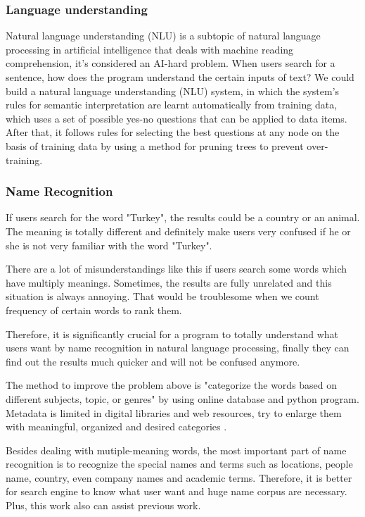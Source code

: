\subsubsection*{Language understanding}

Natural language understanding (NLU) is a subtopic of natural language processing in artificial intelligence that deals with machine reading comprehension, it's considered an AI-hard problem.
When users search for a sentence, how does the program understand the certain inputs of text? We could build a natural language understanding (NLU) system, in which the system's rules for semantic interpretation are learnt automatically from training data, which uses a set of possible yes-no questions that can be applied to data items.
After that, it follows rules for selecting the best questions at any node on the basis of training data by using a method for pruning trees to prevent over-training.

\subsubsection*{Name Recognition}

If users search for the word "Turkey", the results could be a country or an animal. 
The meaning is totally different and definitely make users very confused if he or she is not very familiar with the word "Turkey". 

There are a lot of misunderstandings like this if users search some words which have multiply meanings. 
Sometimes, the results are fully unrelated and this situation is always annoying. 
That would be troublesome when we count frequency of certain words to rank them.

Therefore, it is significantly crucial for a program to totally understand what users want by name recognition in natural language processing, finally they can find out the results much quicker and will not be confused anymore.

The method to improve the problem above is "categorize the words based on different subjects, topic, or genres" by using online database and python program. 
Metadata is limited in digital libraries and web resources, try to enlarge them with meaningful, organized and desired
categories \cite{Kules2006}.

Besides dealing with mutiple-meaning words, the most important part of name recognition is to recognize the special names and terms such as locations, people name, country, even company names and academic terms.
Therefore, it is better for search engine to know what user want and huge name corpus are necessary. 
Plus, this work also can assist previous work.

